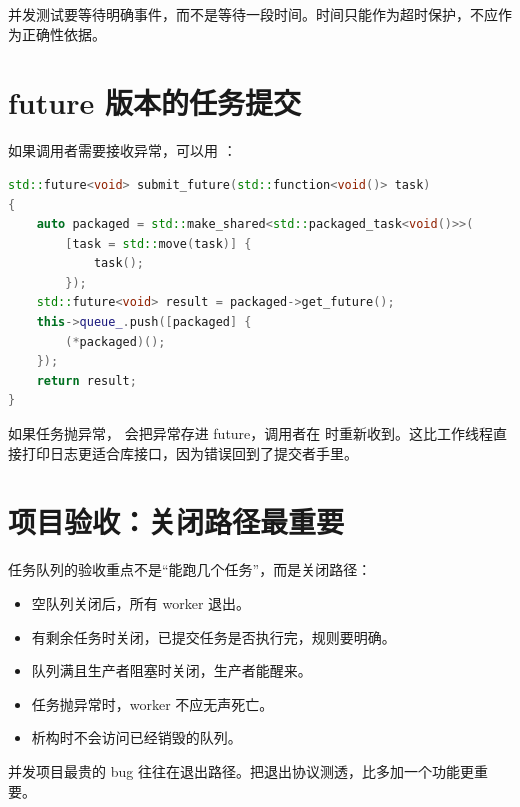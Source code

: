 并发测试要等待明确事件，而不是等待一段时间。时间只能作为超时保护，不应作为正确性依据。

\section{future 版本的任务提交}

如果调用者需要接收异常，可以用 ：

\begin{lstlisting}[language=C++,caption={提交任务并返回 future}]
std::future<void> submit_future(std::function<void()> task)
{
    auto packaged = std::make_shared<std::packaged_task<void()>>(
        [task = std::move(task)] {
            task();
        });
    std::future<void> result = packaged->get_future();
    this->queue_.push([packaged] {
        (*packaged)();
    });
    return result;
}
\end{lstlisting}

如果任务抛异常， 会把异常存进 future，调用者在  时重新收到。这比工作线程直接打印日志更适合库接口，因为错误回到了提交者手里。

\section{项目验收：关闭路径最重要}

任务队列的验收重点不是“能跑几个任务”，而是关闭路径：

\begin{itemize}
  \item 空队列关闭后，所有 worker 退出。
  \item 有剩余任务时关闭，已提交任务是否执行完，规则要明确。
  \item 队列满且生产者阻塞时关闭，生产者能醒来。
  \item 任务抛异常时，worker 不应无声死亡。
  \item 析构时不会访问已经销毁的队列。
\end{itemize}

并发项目最贵的 bug 往往在退出路径。把退出协议测透，比多加一个功能更重要。
